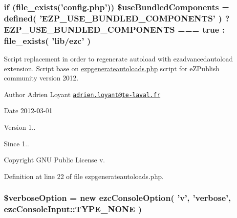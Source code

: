 \hypertarget{ezpgenerateautoloads_8php_abdb1c04b56bd870d8c95d438c1a3ceb7}{
\subsubsection[{\$use\-Bundled\-Components}]{\setlength{\rightskip}{0pt plus 5cm}if (file\-\_\-exists('config.\-php')) \$use\-Bundled\-Components = defined( 'E\-Z\-P\-\_\-\-U\-S\-E\-\_\-\-B\-U\-N\-D\-L\-E\-D\-\_\-\-C\-O\-M\-P\-O\-N\-E\-N\-T\-S' ) ? E\-Z\-P\-\_\-\-U\-S\-E\-\_\-\-B\-U\-N\-D\-L\-E\-D\-\_\-\-C\-O\-M\-P\-O\-N\-E\-N\-T\-S === true \-: file\-\_\-exists( 'lib/ezc' )}}\label{ezpgenerateautoloads_8php_abdb1c04b56bd870d8c95d438c1a3ceb7}
Script replacement in order to regenerate autoload with ezadvancedautoload extension. Script base on \hyperlink{ezpgenerateautoloads_8php}{ezpgenerateautoloads.\-php} script for e\-Z\-Publish community version 2012.

\begin{DoxyAuthor}{Author}
Adrien Loyant \href{mailto:adrien.loyant@te-laval.fr}{\tt adrien.\-loyant@te-\/laval.\-fr}
\end{DoxyAuthor}
\begin{DoxyDate}{Date}
2012-\/03-\/01 
\end{DoxyDate}
\begin{DoxyVersion}{Version}
1.. 
\end{DoxyVersion}
\begin{DoxySince}{Since}
1.. 
\end{DoxySince}
\begin{DoxyCopyright}{Copyright}
G\-N\-U Public License v. 
\end{DoxyCopyright}


Definition at line 22 of file ezpgenerateautoloads.\-php.

\hypertarget{ezpgenerateautoloads_8php_a22133d0c8998aa2d18623686cca5faa4}{
\subsubsection[{\$verbose\-Option}]{\setlength{\rightskip}{0pt plus 5cm}\$verbose\-Option = new ezc\-Console\-Option( 'v', 'verbose', ezc\-Console\-Input\-::\-T\-Y\-P\-E\-\_\-\-N\-O\-N\-E )}}\label{ezpgenerateautoloads_8php_a22133d0c8998aa2d18623686cca5faa4}


